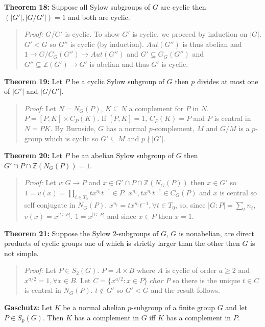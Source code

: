 {\bf Theorem 18:}
Suppose all Sylow subgroups of $G$ are cyclic then $(|G'|, |G/G'|)=1$ and both are cyclic.
\begin{quote}
\emph{Proof:}  
$G/G'$ is cyclic.  To show $G'$ is cyclic, we proceed by induction on $|G|$.
$G' < G$ so $G''$ is cyclic (by induction).  $Aut(G'')$ is thus abelian and
$1 \rightarrow G/C_G(G'') \rightarrow Aut(G'')$ and $G' \subseteq G_G(G'')$ and
$G'' \subseteq {\mathbb Z}(G') \rightarrow G'$ is abelian and thus $G'$ is cyclic.
\end{quote}
{\bf Theorem 19:}
Let $P$ be a cyclic Sylow subgroup of $G$ then $p$ divides at most one of $|G'|$ and $|G/G'|$.
\begin{quote}
\emph{Proof:}  
Let $N=N_G(P)$, $K \subseteq N$ a complement for $P$ in $N$.  $P= [P,K] \times C_P(K)$.
If $[P, K]=1$, $C_P(K)=P$ and $P$ is central in $N=PK$.  By Burnside,
$G$ has a normal $p$-complement, $M$ and $G/M$ is a $p$-group which is cyclic so
$G' \subseteq M$ and $p \nmid |G'|$.
\end{quote}
{\bf Theorem 20:}
Let $P$ be an abelian Sylow subgroup of $G$ then $G' \cap P \cap {\mathbb Z}(N_G(P))=1$.
\begin{quote}
\emph{Proof:}  
Let $v:G \rightarrow P$ and $x \in G' \cap P \cap {\mathbb Z}(N_G(P))$ then $x \in G'$ so
$1=v(x)=\prod_{t \in T_0} t x^{n_t} t^{-1} \in P$.  $x^{n_t} , t x^{n_t} t^{-1} \in C_G(P)$ and
$x$ is central so self conjugate in $N_G(P)$.  $x^{n_t}= t x^{n_t} t^{-1}, \forall t \in T_0$,
so, since $|G:P|= \sum_t n_t$, $v(x)= x^{|G:P|}$.  $1= x^{|G:P|}$ and since $x \in P$ then
$x=1$.
\end{quote}
{\bf Theorem 21:}
Suppose the Sylow $2$-subgroups of $G$, $G$ is nonabelian, are direct products of cyclic groups
one of which is strictly larger than the other then $G$ is not simple.
\begin{quote}
\emph{Proof:}  
Let $P \in S_2(G)$.  $P= A \times B$ where $A$ is cyclic of order $a \ge 2$ and
$x^{a/2}=1, \forall x \in B$.  Let $C= \{ x^{a/2}: x \in P \} \; char \; P$ so there is
the unique $t \in C$ is central in $N_G(P)$.  $t \notin G'$ so $G' < G$ and the result follows.
\end{quote}
{\bf Gaschutz:}  Let $K$ be a normal abelian $p$-subgroup of a finite group $G$ and let
$P \in S_p(G)$.  Then $K$ has a complement in $G$ iff $K$ has a complement in $P$.
